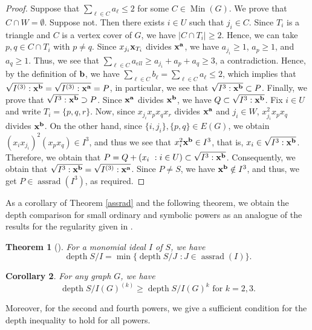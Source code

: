 \documentclass[12pt]{amsart}
\newtheorem{thm}{Theorem}[section]
\newtheorem{cor}[thm]{Corollary}
\theoremstyle{definition}
\theoremstyle{remark}
\DeclareMathOperator{\depth}{depth}
\DeclareMathOperator{\Min}{Min}
\DeclareMathOperator{\assrad}{assrad}
\begin{document}
\begin{proof}
Suppose that $\sum_{\ell\in C}a_{\ell}\leq2$ for some $C\in\Min(G)$. We prove that $C\cap W=\emptyset$. Suppose not. Then there exists $i\in U$ such that $j_{i}\in C$. Since $T_{i}$ is a triangle and $C$ is a vertex cover of $G$, we have $|C\cap T_{i}|\geq2$. Hence, we can take $p,q\in C\cap T_{i}$ with $p\neq q$. Since $x_{j_{i}}{\bf x}_{T_{i}}$ divides ${\bf x}^{\bf a}$, we have $a_{j_{i}}\geq1$, $a_{p}\geq1$, and $a_{q}\geq1$. Thus, we see that $\sum_{\ell\in C}a_{ell}\geq a_{j_{i}}+a_{p}+a_{q}\geq3$, a contradiction. Hence, by the definition of ${\bf b}$, we have $\sum_{\ell\in C}b_{\ell}=\sum_{\ell\in C}a_{\ell}\leq2$, which implies that $\sqrt{I^{(3)}:{\bf x}^{\bf b}}=\sqrt{I^{(3)}:{\bf x}^{\bf a}}=P$, in particular, we see that $\sqrt{I^{3}:{\bf x}^{\bf b}}\subset P$. Finally, we prove that $\sqrt{I^{3}:{\bf x}^{\bf b}}\supset P$. Since ${\bf x}^{\bf a}$ divides ${\bf x}^{\bf b}$, we have $Q\subset\sqrt{I^{3}:{\bf x}^{\bf b}}$. Fix $i\in U$ and write $T_{i}=\{p,q,r\}$. Now, since $x_{j_{i}}x_{p}x_{q}x_{r}$ divides ${\bf x}^{\bf a}$ and $j_{i}\in W$, $x_{j_{i}}^{2}x_{p}x_{q}$ divides ${\bf x}^{\bf b}$. On the other hand, since $\{i,j_{i}\},\{p,q\}\in E(G)$, we obtain $(x_{i}x_{j_{i}})^{2}(x_{p}x_{q})\in I^{3}$, and thus we see that $x_{i}^{2}{\bf x}^{\bf b}\in I^{3}$, that is, $x_{i}\in\sqrt{I^{3}:{\bf x}^{\bf b}}$. Therefore, we obtain that $P=Q+(x_{i}\,\,: i\in U)\subset\sqrt{I^{3}:{\bf x}^{\bf b}}$. Consequently,  we obtain that $\sqrt{I^{3}:{\bf x}^{\bf b}}=\sqrt{I^{(3)}:{\bf x}^{\bf a}}$. Since $P\neq S$, we have ${\bf x}^{\bf b}\notin I^{3}$, and thus, we get $P\in\assrad(I^{3})$, as required. 
\end{proof}

As a corollary of Theorem \ref{assrad} and the following theorem, we obtain the depth comparison for small ordinary and symbolic powers as an analogue of the results for the regularity given in \cite[Theorem 1.1]{mnptv2022}. 

\begin{thm}[\cite{h1977}]\label{Hocster}
For a monomial ideal $I$ of $S$, we have 
$$\depth S/I=\min\{\depth S/J\,\,: J\in\assrad(I)\}.$$
\end{thm}

\begin{cor}\label{small power}
For any graph $G$, we have 
$$\depth S/I(G)^{(k)}\geq\depth S/I(G)^{k}\mbox{ for }k=2,3.$$
\end{cor}

Moreover, for the second and fourth powers, we give a sufficient condition for the depth inequality to hold for all powers.
\end{document}
